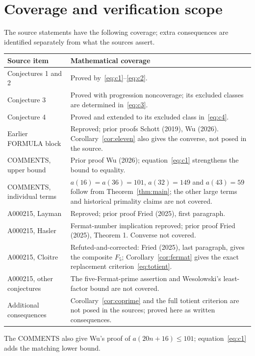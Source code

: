 \documentclass[11pt]{article}
\begin{document}
\section{Coverage and verification scope}
The source statements have the following coverage; extra consequences are
identified separately from what the sources assert.
\begin{center}
\begin{tabular}{>{\raggedright\arraybackslash}p{35mm}>{\raggedright\arraybackslash}p{104mm}}
\toprule
Source item & Mathematical coverage\\
\midrule
Conjectures 1 and 2 & Proved by~\eqref{eq:c1}--\eqref{eq:c2}.\\
Conjecture 3 & Proved with progression noncoverage; its excluded classes
are determined in~\eqref{eq:c3}.\\
Conjecture 4 & Proved and extended to its excluded class in~\eqref{eq:c4}.\\
Earlier FORMULA block & Reproved; prior proofs Schott (2019), Wu (2026).
Corollary~\ref{cor:eleven} also gives the converse, not posed in the source.\\
COMMENTS, upper bound & Prior proof Wu (2026); equation~\eqref{eq:c1}
strengthens the bound to equality.\\
COMMENTS, individual terms & $a(16)=a(36)=101$, $a(32)=149$ and $a(43)=59$
follow from Theorem~\ref{thm:main}; the other large terms and historical
primality claims are not covered.\\
A000215, Layman & Reproved; prior proof Fried (2025), first paragraph.\\
A000215, Hasler & Fermat-number implication reproved; prior proof Fried
(2025), Theorem 1. Converse not covered.\\
A000215, Cloitre & Refuted-and-corrected: Fried (2025), last paragraph,
gives the composite $F_5$; Corollary~\ref{cor:fermat} gives the exact
replacement criterion~\eqref{eq:totient}.\\
A000215, other conjectures & The five-Fermat-prime assertion and
Wesolowski's least-factor bound are not covered.\\
Additional consequences & Corollary~\ref{cor:coprime} and the full totient
criterion are not posed in the sources; proved here as written consequences.\\
\bottomrule
\end{tabular}
\end{center}
The COMMENTS also give Wu's proof of $a(20n+16)\leq101$; equation~\eqref{eq:c1}
adds the matching lower bound.
\end{document}
